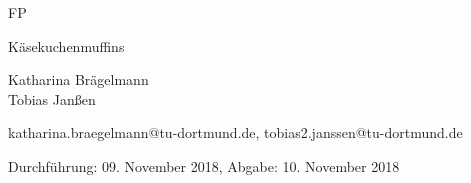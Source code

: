 \newcommand{\Titel}{Käsekuchenmuffins}
\newcommand{\DatumDu}{09. November 2018}
\newcommand{\DatumAb}{10. November 2018}
\newcommand{\Autoreins}{Katharina Brägelmann}
\newcommand{\Emaileins}{katharina.braegelmann@tu-dortmund.de}
\newcommand{\Autorzwei}{Tobias Janßen}
\newcommand{\Emailzwei}{tobias2.janssen@tu-dortmund.de}



\begin{titlepage}

\begin{center} \large

  FP
  \vspace*{2.5cm}

  {\huge \Titel}
  \vspace*{3cm}

  \Autoreins
  \\\Autorzwei
  \vspace*{1.5cm}

  \Emaileins, \Emailzwei


  Durchführung: \DatumDu, Abgabe: \DatumAb
  \vspace*{4.5cm}


\end{center}
\end{titlepage}
